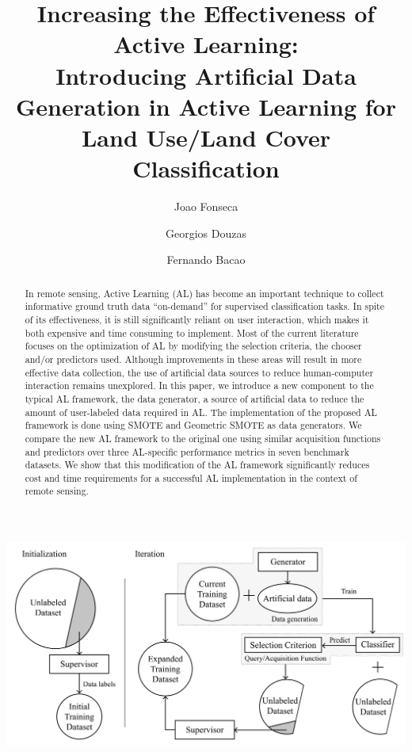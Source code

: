 \documentclass[preprint,12pt]{elsarticle}
\date{}
\begin{document}
\begin{frontmatter}

\title{
    Increasing the Effectiveness of Active Learning:\\
    Introducing Artificial Data Generation in Active Learning for Land Use/Land Cover Classification}


\author[inst1]{Joao Fonseca} 
\author[inst1]{Georgios Douzas}
\author[inst1]{Fernando Bacao}


\begin{abstract}
    In remote sensing, Active Learning (AL) has become an important technique
    to collect informative ground truth data ``on-demand'' for supervised
    classification tasks. In spite of its effectiveness, it is still
    significantly reliant on user interaction, which makes it both expensive
    and time consuming to implement. Most of the current literature focuses on
    the optimization of AL by modifying the selection criteria, the chooser
    and/or predictors used. Although improvements in these areas will result
    in more effective data collection, the use of artificial data sources to
    reduce human-computer interaction remains unexplored. In this paper, we
    introduce a new component to the typical AL framework, the data generator,
    a source of artificial data to reduce the amount of user-labeled data
    required in AL\@. The implementation of the proposed AL framework is done
    using SMOTE and Geometric SMOTE as data generators. We compare the new AL
    framework to the original one using similar acquisition functions and
    predictors over three AL-specific performance metrics in seven benchmark
    datasets. We show that this modification of the AL framework significantly
    reduces cost and time requirements for a successful AL implementation in
    the context of remote sensing. 
\end{abstract}


\begin{graphicalabstract}
\centering
\includegraphics[width=.85\linewidth]{../analysis/graphical_abstract}
\end{graphicalabstract}


\end{frontmatter}
\end{document}
